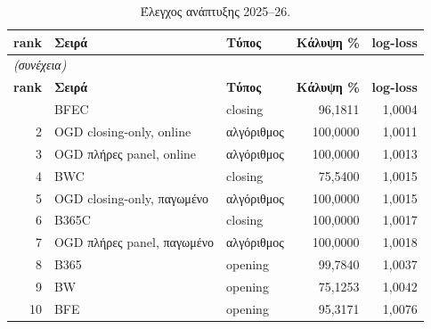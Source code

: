 {\small
\begin{longtable}{@{}rllrr@{}}
\caption{Έλεγχος ανάπτυξης 2025--26.}\label{app:dep}\\
\toprule \textbf{rank} & \textbf{Σειρά} & \textbf{Τύπος} & \textbf{Κάλυψη \%} & \textbf{log-loss} \\\midrule\endfirsthead
\multicolumn{5}{l}{\emph{(συνέχεια)}}\\\toprule \textbf{rank} & \textbf{Σειρά} & \textbf{Τύπος} & \textbf{Κάλυψη \%} & \textbf{log-loss} \\\midrule\endhead
\bottomrule\endfoot
1 & BFEC & closing & 96,1811 & 1,0004 \\
2 & OGD closing-only, online & αλγόριθμος & 100,0000 & 1,0011 \\
3 & OGD πλήρες panel, online & αλγόριθμος & 100,0000 & 1,0013 \\
4 & BWC & closing & 75,5400 & 1,0015 \\
5 & OGD closing-only, παγωμένο & αλγόριθμος & 100,0000 & 1,0015 \\
6 & B365C & closing & 100,0000 & 1,0017 \\
7 & OGD πλήρες panel, παγωμένο & αλγόριθμος & 100,0000 & 1,0018 \\
8 & B365 & opening & 99,7840 & 1,0037 \\
9 & BW & opening & 75,1253 & 1,0042 \\
10 & BFE & opening & 95,3171 & 1,0076 \\
\end{longtable}
}


